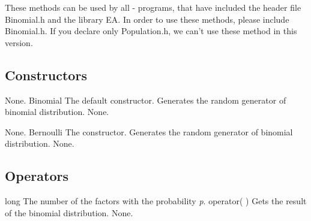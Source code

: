 \noindent
These methods can be used by all \cpp - programs, that have included the
header file Binomial.h and the library EA. In order to use these
methods, please include Binomial.h. If you declare only Population.h,
we can't use these method in this version. 

\clearpage

\subsection{Constructors}

\setNormalInstance
\setCorrectWidthThree{8pt}
\printMethodWithParamsSaved
{}
{None.}
{Binomial}
{The default constructor. Generates the random generator of binomial distribution.}
{None.}
\setCorrectWidthThree{4pt}

\setNormalInstance
\setCorrectWidthThree{8pt}
\printMethodWithParamsSaved
{}
{None.}
{Bernoulli}
{The constructor. Generates the random generator of binomial distribution.}
{None.}
\setCorrectWidthThree{4pt}

\vspace*{10mm}

\subsection{Operators}

\setNormalInstance
\setCorrectWidthThree{8pt}
\printMethodWithParamsSaved
{long}
{The number of the factors with the probability {\em p}.}
{operator( )}
{Gets the result of the binomial distribution.}
{None.}
\setCorrectWidthThree{4pt}

